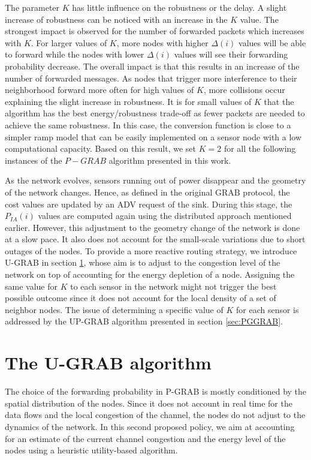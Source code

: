 \documentclass[journal, peerreview, onecolumn, draftcls]{IEEEtran}
\begin{document}
The parameter $K$ has little influence on the robustness or the delay. A slight increase of robustness can be noticed with an increase in the $K$ value. The strongest impact is observed for the number of forwarded packets which increases with $K$. For larger values of $K$, more nodes with higher $\Delta(i)$ values will be able to forward while the nodes with lower $\Delta(i)$ values will see their forwarding probability decrease. The overall impact is that this results in an increase of the number of forwarded messages. As nodes that trigger more interference to their neighborhood forward more often for high values of $K$, more collisions occur explaining the slight increase in robustness. It is for small values of $K$ that the algorithm has the best energy/robustness trade-off as fewer packets are needed to achieve the same robustness. In this case, the conversion function is close to a simpler ramp model that can be easily implemented on a sensor node with a low computational capacity. Based on this result, we set $K=2$ for all the following instances of the $P-GRAB$ algorithm presented in this work.

As the network evolves, sensors running out of power disappear and the geometry of the network changes. Hence, as defined in the original GRAB protocol, the cost values are updated by an ADV request of the sink. During this stage, the $P_{IA}(i)$ values are computed again using the distributed approach mentioned earlier. However, this adjustment to the geometry change of the network is done at a slow pace. It also does not account for the small-scale variations due to short outages of the nodes. To provide a more reactive routing strategy, we introduce U-GRAB in section \ref{sec:GGRAB}, whose aim is to adjust to the congestion level of the network on top of accounting for the energy depletion of a node.
Assigning the same value for $K$ to each sensor in the network might not trigger the best possible outcome since it does not account for the local density of a set of neighbor nodes. The issue of determining a specific value of $K$ for each sensor is addressed by the UP-GRAB algorithm presented in section \ref{sec:PGGRAB}.

\section{The U-GRAB algorithm}\label{sec:GGRAB}

The choice of the forwarding probability in P-GRAB is mostly conditioned by the spatial distribution of the nodes. Since it does not account in real time for the data flows and the local congestion of the channel, the nodes do not adjust to the dynamics of the network. In this second proposed policy, we aim at accounting for an estimate of the current channel congestion and the energy level of the nodes using a heuristic utility-based algorithm.
\end{document}
